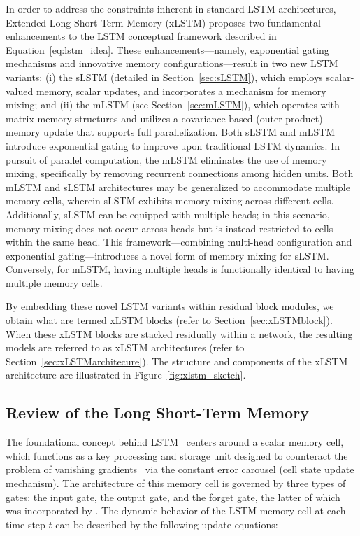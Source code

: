 In order to address the constraints inherent in standard LSTM architectures, Extended Long Short-Term Memory (xLSTM) proposes two fundamental enhancements to the LSTM conceptual framework described in Equation~\eqref{eq:lstm_idea}. These enhancements—namely, exponential gating mechanisms and innovative memory configurations—result in two new LSTM variants: (i) the sLSTM (detailed in Section~\ref{sec:sLSTM}), which employs scalar-valued memory, scalar updates, and incorporates a mechanism for memory mixing; and (ii) the mLSTM (see Section~\ref{sec:mLSTM}), which operates with matrix memory structures and utilizes a covariance-based (outer product) memory update that supports full parallelization. Both sLSTM and mLSTM introduce exponential gating to improve upon traditional LSTM dynamics. In pursuit of parallel computation, the mLSTM eliminates the use of memory mixing, specifically by removing recurrent connections among hidden units. Both mLSTM and sLSTM architectures may be generalized to accommodate multiple memory cells, wherein sLSTM exhibits memory mixing across different cells. Additionally, sLSTM can be equipped with multiple heads; in this scenario, memory mixing does not occur across heads but is instead restricted to cells within the same head. This framework—combining multi-head configuration and exponential gating—introduces a novel form of memory mixing for sLSTM. Conversely, for mLSTM, having multiple heads is functionally identical to having multiple memory cells.

By embedding these novel LSTM variants within residual block modules, we obtain what are termed xLSTM blocks (refer to Section~\ref{sec:xLSTMblock}). When these xLSTM blocks are stacked residually within a network, the resulting models are referred to as xLSTM architectures (refer to Section~\ref{sec:xLSTMarchitecure}). The structure and components of the xLSTM architecture are illustrated in Figure~\ref{fig:xlstm_sketch}.

\subsection{Review of the Long Short-Term Memory}
\label{sec:orgLSTM}

The foundational concept behind LSTM~\citep{Hochreiter:91,Hochreiter:97nips,Hochreiter:97} centers around a scalar memory cell, which functions as a key processing and storage unit designed to counteract the problem of vanishing gradients~\citep{Hochreiter:91,Hochreiter:00book} via the constant error carousel (cell state update mechanism). The architecture of this memory cell is governed by three types of gates: the input gate, the output gate, and the forget gate, the latter of which was incorporated by \citet{Gers:00}. The dynamic behavior of the LSTM memory cell at each time step $t$ can be described by the following update equations:


